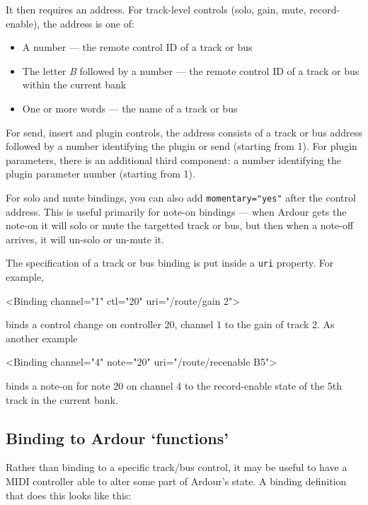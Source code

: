 \documentclass[10pt,a4paper]{book}
\begin{document}
It then requires an address.  For track-level controls (solo, gain, mute, record-enable), the address is one of:

\begin{itemize}
\item A number --- the remote control ID of a track or bus
\item The letter \emph{B} followed by a number --- the remote control ID of a track or bus within the current bank
\item One or more words --- the name of a track or bus
\end{itemize}

For send, insert and plugin controls, the address consists of a track
or bus address followed by a number identifying the plugin or send
(starting from 1).  For plugin parameters, there is an additional third
component: a number identifying the plugin parameter number (starting
from 1).

For solo and mute bindings, you can also add \texttt{momentary="yes"} after the
control address. This is useful primarily for note-on bindings --- when
Ardour gets the note-on it will solo or mute the targetted track or
bus, but then when a note-off arrives, it will un-solo or un-mute it.

The specification of a track or bus binding is put inside a \texttt{uri} property.  For example,

\begin{listing}
<Binding channel="1" ctl="20" uri="/route/gain 2">
\end{listing}

binds a control change on controller 20, channel 1 to the gain of track 2.  As another example

\begin{listing}
<Binding channel="4" note="20" uri="/route/recenable B5">
\end{listing}

binds a note-on for note 20 on channel 4 to the record-enable state of
the 5th track in the current bank.



\subsection{Binding to Ardour `functions'}

Rather than binding to a specific track/bus control, it may be useful
to have a MIDI controller able to alter some part of Ardour's state. A
binding definition that does this looks like this:
\end{document}
